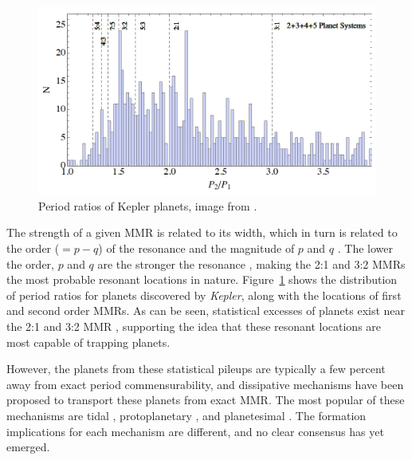 \documentclass[12pt,letter]{aastex}
\newcommand{\kep}{{\it Kepler}\xspace}
\begin{document}
\begin{figure}
\centering
\includegraphics[width=1.00\textwidth]{Figures/KeplerPeriods.png}
\caption{
\footnotesize Period ratios of Kepler planets, image from \citet{Goldreich2014}.}
\label{fig:KepMMR}
\end{figure}

The strength of a given MMR is related to its width, which in turn is related to the order ($= p - q$) of the resonance and the magnitude of $p$ and $q$ \citep{SSD1999}. 
The lower the order, $p$ and $q$ are the stronger the resonance \citep{SSD1999}, making the 2:1 and 3:2 MMRs the most probable resonant locations in nature. 
Figure~\ref{fig:KepMMR} shows the distribution of period ratios for planets discovered by \kep, along with the locations of first and second order MMRs. 
As can be seen, statistical excesses of planets exist near the 2:1 and 3:2 MMR \citep{Lissauer2011,Fabrycky2014,Steffen2015}, supporting the idea that these resonant locations are most capable of trapping planets.

However, the planets from these statistical pileups are typically a few percent away from exact period commensurability, and dissipative mechanisms have been proposed to transport these planets from exact MMR. 
The most popular of these mechanisms are tidal \citep{LithwickWu2012, Batygin2013, Delisle2014}, protoplanetary \citep{Rein2012b, Baruteau2013, Goldreich2014}, and planetesimal \citep{Moore2013, Chatterjee2015}. 
The formation implications for each mechanism are different, and no clear consensus has yet emerged.

\end{document}
